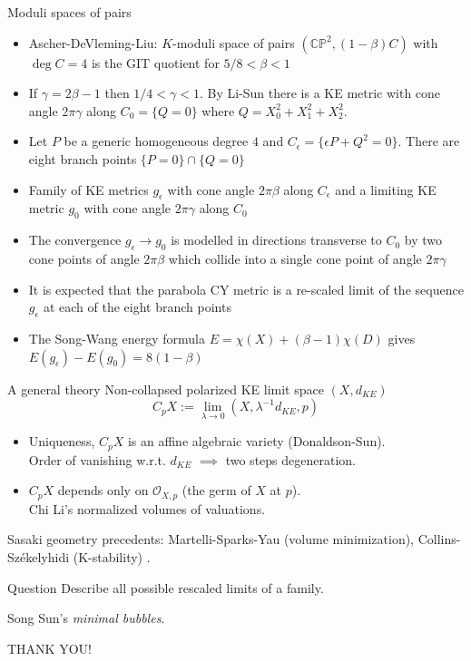 \documentclass{beamer}
\newcommand{\CP}{\mathbb{CP}}
\begin{document}
\begin{frame}{Moduli spaces of pairs}
	\begin{itemize}
		\item Ascher-DeVleming-Liu: \(K\)-moduli space of pairs \((\CP^2, (1-\beta)C)\) with \(\deg C = 4\) is the GIT quotient for \(5/8 < \beta < 1\)
		\item If \(\gamma = 2\beta -1\) then \(1/4 < \gamma < 1\). By Li-Sun there is a KE metric with cone angle \(2\pi\gamma\) along \(C_0 = \{Q=0\}\) where \(Q=X_0^2+X_1^2+X_2^2\).
		
		\item Let \(P\) be a generic homogeneous degree \(4\) and \(C_{\epsilon} = \{\epsilon P + Q^2=0\}\). There are eight branch points \(\{P=0\} \cap \{Q=0\}\)
		
		\item Family of KE metrics $g_{\epsilon}$ with cone angle $2\pi\beta$  along $C_{\epsilon}$ and a limiting KE metric $g_0$ with cone angle $2\pi\gamma$ along $C_0$
		
		\item The convergence \(g_{\epsilon} \to g_0\) is modelled 
		in directions transverse to \(C_0\) by two cone points of angle \(2\pi\beta\) which collide into a single cone point of angle \(2\pi\gamma\)
		
		 \item It is expected that the parabola CY metric is a re-scaled limit of the sequence \(g_{\epsilon}\) at each of the eight branch points
		 
		 \item The Song-Wang energy formula \(E=\chi(X) + (\beta-1)\chi(D)\) gives \(E(g_{\epsilon}) - E(g_0) = 8 (1-\beta)\) 
	\end{itemize}
		
\end{frame}



\begin{frame}{A general theory}
	Non-collapsed polarized KE limit space \((X, d_{KE})\)
	\[C_p X := \lim_{\lambda \to 0} (X, \lambda^{-1}d_{KE},p)\]
	\begin{itemize}
		\item Uniqueness, \(C_pX\) is an affine algebraic variety (Donaldson-Sun).\\
		Order of vanishing w.r.t. \(d_{KE}\) \(\implies\) two steps degeneration.
		\item \(C_pX\) depends only on \(\mathcal{O}_{X,p}\) (the germ of \(X\) at \(p\)). \\
		Chi Li's normalized volumes of valuations.
	\end{itemize}
	
	Sasaki geometry precedents: Martelli-Sparks-Yau (volume minimization),
	Collins-Sz\'ekelyhidi (K-stability) .
	\begin{block}{Question}
		Describe all possible rescaled limits of a family.
	\end{block}
	
	Song Sun's \emph{minimal bubbles}.
	
\end{frame}

\begin{frame}{}
	\centering
	\Huge{THANK YOU!}
\end{frame}
\end{document}
